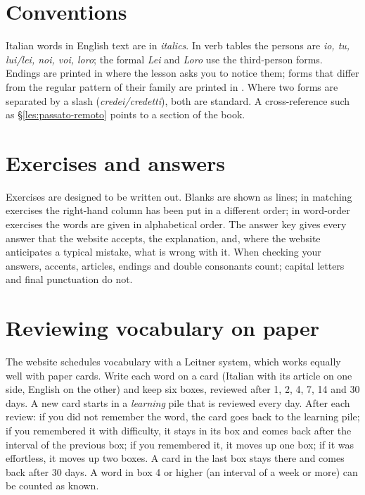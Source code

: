 \section*{Conventions}

Italian words in English text are in \textit{italics}. In verb tables the persons are \textit{io, tu, lui/lei, noi, voi, loro}; the formal \textit{Lei} and \textit{Loro} use the third-person forms. Endings are printed in  where the lesson asks you to notice them; forms that differ from the regular pattern of their family are printed in . Where two forms are separated by a slash (\textit{credei/credetti}), both are standard. A cross-reference such as \S\ref{les:passato-remoto} points to a section of the book.

\section*{Exercises and answers}

Exercises are designed to be written out. Blanks are shown as lines; in matching exercises the right-hand column has been put in a different order; in word-order exercises the words are given in alphabetical order. The answer key gives every answer that the website accepts, the explanation, and, where the website anticipates a typical mistake, what is wrong with it. When checking your answers, accents, articles, endings and double consonants count; capital letters and final punctuation do not.

\section*{Reviewing vocabulary on paper}

The website schedules vocabulary with a Leitner system, which works equally well with paper cards. Write each word on a card (Italian with its article on one side, English on the other) and keep six boxes, reviewed after 1, 2, 4, 7, 14 and 30 days. A new card starts in a \emph{learning} pile that is reviewed every day. After each review: if you did not remember the word, the card goes back to the learning pile; if you remembered it with difficulty, it stays in its box and comes back after the interval of the previous box; if you remembered it, it moves up one box; if it was effortless, it moves up two boxes. A card in the last box stays there and comes back after 30 days. A word in box 4 or higher (an interval of a week or more) can be counted as known.

\tableofcontents
